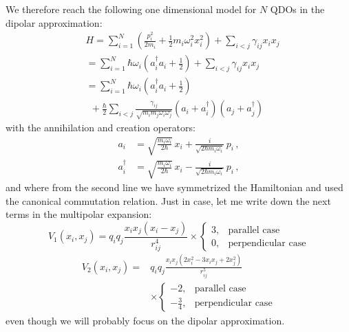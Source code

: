 \documentclass[reprint, amsmath, amssymb, aps]{revtex4-2}
\begin{document}
        We therefore reach the following one dimensional model for $N$ QDOs in the dipolar approximation:
        \begin{equation}
            \begin{split}
                &H = \sum_{i=1}^N\left(\frac{p_i^2}{2m_i}+\frac{1}{2}m_i\omega_i^2 x_i^2\right) + \sum_{i<j}\gamma_{ij}x_ix_j\\
                &= \sum_{i=1}^N\hbar\omega_i\left(a_i^\dagger a_i+\frac{1}{2}\right) + \sum_{i<j}\gamma_{ij}x_ix_j\\
                &= \sum_{i=1}^N\hbar\omega_i\left(a_i^\dagger a_i+\frac{1}{2}\right) \\
                &\ \ +\frac{\hbar}{2}\sum_{i<j}\frac{\gamma_{ij}}{\sqrt{m_im_j\omega_i\omega_j}}\left(a_i+a_i^\dagger\right)\left(a_j+a_j^\dagger\right)
            \end{split}
        \end{equation}
        with the annihilation and creation operators:
        \begin{equation}
            \begin{split}
                a_i &= \sqrt{\frac{m_i\omega_i}{2\hbar}}\,x_i+\frac{i}{\sqrt{2\hbar m_i\omega_i}}\,p_i\,,\\
                a_i^\dagger &= \sqrt{\frac{m_i\omega_i}{2\hbar}}\,x_i-\frac{i}{\sqrt{2\hbar m_i\omega_i}}\,p_i\,,
            \end{split}
        \end{equation}
        and where from the second line we have symmetrized the Hamiltonian and used the canonical commutation relation.
        Just in case, let me write down the next terms in the multipolar expansion:
        \begin{equation}
            V_1(x_i, x_j) = q_iq_j\frac{x_ix_j(x_i-x_j)}{r_{ij}^4}\times
            \begin{cases}
                3, & \text{parallel case} \\
                0, & \text{perpendicular case}
            \end{cases}
        \end{equation}
        \begin{equation}
            \begin{split}
                V_2(x_i, x_j) = &q_iq_j\frac{x_ix_j(2x_i^2-3x_ix_j+2x_j^2)}{r_{ij}^5}\\
                &\times
                \begin{cases}
                    -2, & \text{parallel case} \\
                -\frac{3}{4}, & \text{perpendicular case}
                \end{cases}
            \end{split}
        \end{equation}
        even though we will probably focus on the dipolar approximation.
\end{document}
